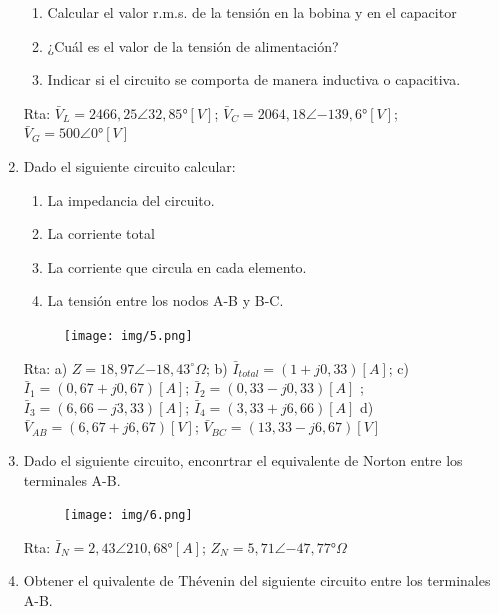 \documentclass[10pt,a4paper]{article}
\begin{document}
\begin{enumerate}
\begin{enumerate}
	\item Calcular el valor r.m.s. de la tensión en la bobina y en el capacitor 
	\item ¿Cuál es el valor de la tensión de alimentación?
	\item Indicar si el circuito se comporta de manera inductiva o capacitiva.
\end{enumerate}

Rta: $\bar{V}_L=2466,25 \angle{32,85°}[V]$; $\bar{V}_C=2064,18\angle{-139,6°}[V]$; $\bar{V}_G=500\angle{0°}[V]$
\item Dado el siguiente circuito calcular:

\begin{enumerate}
	\item La impedancia del circuito.
	\item La corriente total
	\item La corriente que circula en cada elemento.
	\item La tensión entre los nodos A-B y B-C.
\end{enumerate}


\begin{figure}[H]
	\centering
	\texttt{[image: img/5.png]}
	\label{e7}
\end{figure}

Rta: a) $Z=18,97\angle{-18,43^{\circ}}\Omega$; b) $\bar{I}_{total}=(1+j0,33)[A]$; c) $\bar{I}_1=(0,67+j0,67)[A]$; $\bar{I}_2=(0,33-j0,33)[A]$  ;$\bar{I}_3=(6,66-j3,33)[A]$; $\bar{I}_4=(3,33+j6,66)[A]$ d) $\bar{V}_{AB}=(6,67+j6,67)[V]$; $\bar{V}_{BC}=(13,33-j6,67)[V]$
\item Dado el siguiente circuito, enconrtrar el equivalente de Norton entre los terminales A-B.

\begin{figure}[H]
	\centering
	\texttt{[image: img/6.png]}
	\label{e8}
\end{figure}

Rta: $\bar{I}_N=2,43\angle{210,68°}[A]$; $Z_N=5,71\angle{-47,77°}\Omega$
\item Obtener el quivalente de Thévenin del siguiente circuito entre los terminales A-B. 


\end{enumerate}
\end{document}
